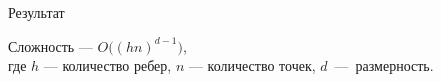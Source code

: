 \documentclass[]{beamer} %
\begin{document}









%
%

\begin{frame}{Результат}

    Сложность --- $O\big((hn)^{d-1}\big)$,\\
    где $h$ --- количество ребер, $n$ --- количество точек, $d$~---~размерность.


\end{frame}
\end{document}

